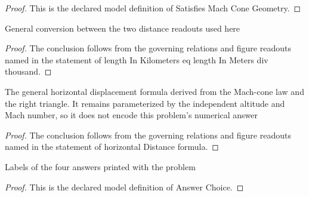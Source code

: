 \begin{proof}
  This is the declared model definition of Satisfies Mach Cone Geometry.
\end{proof}
\begin{lemma}
  \label{lem:physics:phyx-mini-0221:phyxminiproblems-problemphyxmini0221-lengthinkilometers-eq-lengthinmeters-div-thousand}
  General conversion between the two distance readouts used here
\end{lemma}
\begin{proof}
  The conclusion follows from the governing relations and figure readouts named in the statement of length In Kilometers eq length In Meters div thousand.
\end{proof}
\begin{lemma}
  \label{lem:physics:phyx-mini-0221:phyxminiproblems-problemphyxmini0221-horizontaldistance-formula}
  The general horizontal displacement formula derived from the Mach-cone law and the right triangle. It remains parameterized by the independent altitude and Mach number, so it does not encode this problem's numerical answer
\end{lemma}
\begin{proof}
  The conclusion follows from the governing relations and figure readouts named in the statement of horizontal Distance formula.
\end{proof}
\begin{definition}
  \label{def:physics:phyx-mini-0221:phyxminiproblems-problemphyxmini0221-answerchoice}
  Labels of the four answers printed with the problem
\end{definition}
\begin{proof}
  This is the declared model definition of Answer Choice.
\end{proof}
